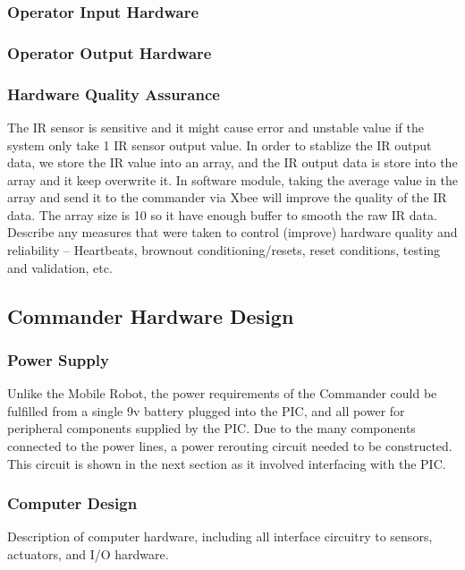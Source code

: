\documentclass[11pt,a4paper]{article}
\begin{document}
    \subsubsection{Operator Input Hardware}
   
    \subsubsection{Operator Output Hardware}
    
    \subsubsection{Hardware Quality Assurance}
    
      The IR sensor is sensitive and it might cause error and unstable value if the system only take 1 IR sensor output value. In order to stablize the IR output data, we store the IR value into an array, and the IR output data is store into the array and it keep overwrite it. In software module, taking the average value in the array and send it to the commander via Xbee will improve the quality of the IR data. The array size is 10 so it have enough buffer to smooth the raw IR data.\\
      
    Describe any measures that were taken to control (improve) hardware quality and reliability – Heartbeats, brownout conditioning/resets, reset conditions, testing and validation, etc.
  \subsection{Commander Hardware Design}
    \subsubsection{Power Supply}
      Unlike the Mobile Robot, the power requirements of the Commander could be fulfilled from a single 9v battery plugged into the PIC, and all power for peripheral components supplied by the PIC. Due to the many components connected to the power lines, a power rerouting circuit needed to be constructed. This circuit is shown in the next section as it involved interfacing with the PIC.
    \subsubsection{Computer Design}
      Description of computer hardware, including all interface circuitry to sensors, actuators, and I/O hardware.
\end{document}
